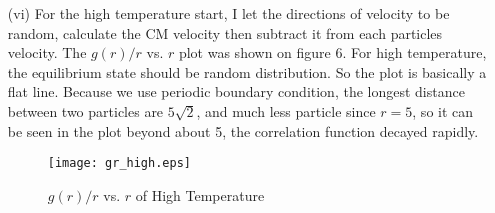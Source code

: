 \documentclass{article}
\begin{document}
\begin{enumerate}
\vskip 1cm
\item[(vi)] 
For the high temperature start, I let the directions of velocity to be random, calculate the CM velocity then subtract it from each particles velocity.  The $g(r)/r$ vs. $r$ plot was shown on figure 6.  For high temperature, the equilibrium state should be random distribution.  So the plot is basically a flat line.  Because we use periodic boundary condition, the longest distance between two particles are $5\sqrt 2$, and much less particle since $r=5$, so it can be seen in the plot beyond about 5, the correlation function decayed rapidly.
\begin{figure}[ht]
   \begin{center}
   {\texttt{[image: gr\_high.eps]}}
   \caption{$g(r)/r$ vs. $r$ of High Temperature}
   \end{center}
  \end{figure} 
  
\end{enumerate}
\newpage
\appendix
\end{document}
